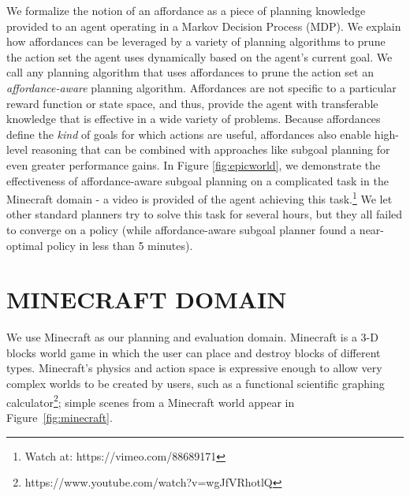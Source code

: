\documentclass[]{article}
\begin{document}
      
      We formalize the notion of an affordance as a piece of planning
      knowledge provided to an agent operating in a Markov Decision
      Process (MDP). We explain how affordances can be leveraged by a
      variety of planning algorithms to prune the action set the agent
      uses dynamically based on the agent's current goal.  We call any
      planning algorithm that uses affordances to prune the action set
      an {\it affordance-aware} planning algorithm.  Affordances are
      not specific to a particular reward function or state space, and thus,
      provide the agent with transferable knowledge that is effective
      in a wide variety of problems. Because affordances
      define the {\em kind} of goals for which actions are useful,
      affordances also enable high-level reasoning that can
      be combined with approaches like subgoal planning for even
      greater performance gains. In Figure \ref{fig:epicworld}, we demonstrate the effectiveness of
      affordance-aware subgoal planning on a complicated task
      in the Minecraft domain - a video is provided of the agent achieving this task.\footnote{Watch at: https://vimeo.com/88689171}
      We let other standard planners try to solve this task for several hours, but they all failed
      to converge on a policy (while affordance-aware subgoal planner found a near-optimal
      policy in less than 5 minutes).





\section{MINECRAFT DOMAIN}
We use Minecraft as our planning and evaluation domain. Minecraft is a
3-D blocks world game in which the user can place and destroy blocks
of different types.  Minecraft's physics and action space is expressive
enough to allow very complex worlds to be created by users, such as a
functional scientific graphing calculator\footnote{https://www.youtube.com/watch?v=wgJfVRhotlQ};
simple scenes from a Minecraft world appear in Figure~\ref{fig:minecraft}.  
\end{document}
